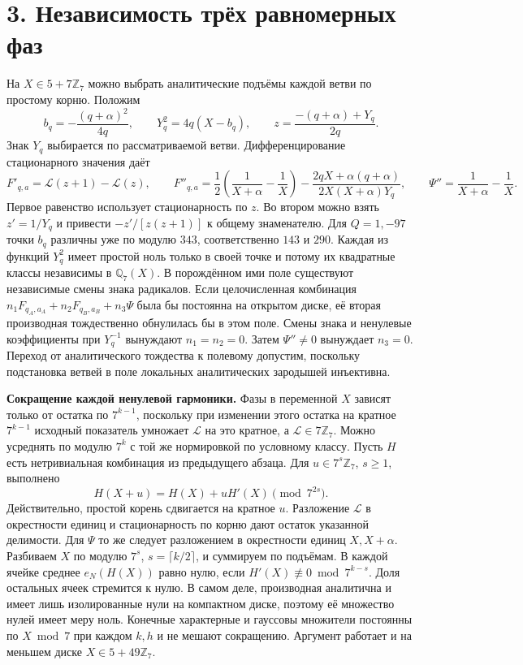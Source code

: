 \documentclass[11pt,a4paper]{article}
\newcommand{\sect}[1]{\section*{\sffamily\color{ink}#1}}
\newcommand{\subt}[1]{\par\medskip\noindent\textbf{#1.}\quad}
\newcommand{\Zp}{\mathbb Z_7}
\newcommand{\Qp}{\mathbb Q_7}
\begin{document}
\newpage
\sect{3. Независимость трёх равномерных фаз}
На \(X\in5+7\Zp\) можно выбрать аналитические подъёмы каждой ветви по простому корню. Положим
\[
  b_q=-\frac{(q+\alpha)^2}{4q},\qquad
  Y_q^2=4q(X-b_q),\qquad
  z=\frac{-(q+\alpha)+Y_q}{2q}.
\]
Знак \(Y_q\) выбирается по рассматриваемой ветви. Дифференцирование стационарного значения даёт
\[
 F'_{q,a}=\mathcal L(z+1)-\mathcal L(z),\qquad
 F''_{q,a}=
 \frac12\left(\frac1{X+\alpha}-\frac1X\right)
 -\frac{2qX+\alpha(q+\alpha)}{2X(X+\alpha)Y_q},\qquad
 \Psi''=\frac1{X+\alpha}-\frac1X .
\]
Первое равенство использует стационарность по \(z\). Во втором можно взять \(z'=1/Y_q\) и привести \(-z'/[z(z+1)]\) к общему знаменателю. Для \(Q=1,-97\) точки \(b_q\) различны уже по модулю \(343\), соответственно \(143\) и \(290\). Каждая из функций \(Y_q^2\) имеет простой ноль только в своей точке и потому их квадратные классы независимы в \(\Qp(X)\). В порождённом ими поле существуют независимые смены знака радикалов. Если целочисленная комбинация \(n_1 F_{q_A,a_A}+n_2 F_{q_B,a_B}+n_3\Psi\) была бы постоянна на открытом диске, её вторая производная тождественно обнулилась бы в этом поле. Смены знака и ненулевые коэффициенты при \(Y_q^{-1}\) вынуждают \(n_1=n_2=0\). Затем \(\Psi''\ne0\) вынуждает \(n_3=0\). Переход от аналитического тождества к полевому допустим, поскольку подстановка ветвей в поле локальных аналитических зародышей инъективна.

\subt{Сокращение каждой ненулевой гармоники}
Фазы в переменной \(X\) зависят только от остатка по \(7^{k-1}\), поскольку при изменении этого остатка на кратное \(7^{k-1}\) исходный показатель умножает \(\mathcal L\) на это кратное, а \(\mathcal L\in7\Zp\). Можно усреднять по модулю \(7^k\) с той же нормировкой по условному классу. Пусть \(H\) есть нетривиальная комбинация из предыдущего абзаца. Для \(u\in7^s\Zp\), \(s\ge1\), выполнено
\[
       H(X+u)=H(X)+uH'(X)\pmod{7^{2s}} .
\]
Действительно, простой корень сдвигается на кратное \(u\). Разложение \(\mathcal L\) в окрестности единиц и стационарность по корню дают остаток указанной делимости. Для \(\Psi\) то же следует разложением в окрестности единиц \(X,X+\alpha\). Разбиваем \(X\) по модулю \(7^s\), \(s=\lceil k/2\rceil\), и суммируем по подъёмам. В каждой ячейке среднее \(e_N(H(X))\) равно нулю, если \(H'(X)\not\equiv0\bmod7^{k-s}\). Доля остальных ячеек стремится к нулю. В самом деле, производная аналитична и имеет лишь изолированные нули на компактном диске, поэтому её множество нулей имеет меру ноль. Конечные характерные и гауссовы множители постоянны по \(X\bmod7\) при каждом \(k,h\) и не мешают сокращению. Аргумент работает и на меньшем диске \(X\in5+49\Zp\).
\end{document}
